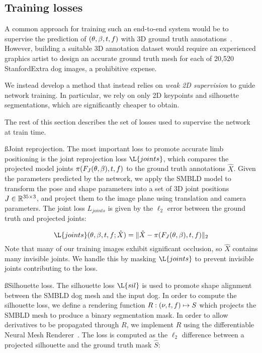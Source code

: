   \subsection{Training losses}
  
  A common approach for training such an end-to-end system would be to supervise the prediction of $(\theta, \beta, t, f)$ with 3D ground truth annotations~\cite{kolotouros2019learning,kanazawa18end-to-end,pavlakos18learning}. However, building a suitable 3D annotation dataset would require an experienced graphics artist to design an accurate ground truth mesh for each of 20,520 StanfordExtra dog images, a prohibitive expense.
  
  
  We instead develop a method that instead relies on \emph{weak 2D supervision} to guide network training. In particular, we rely on only 2D keypoints and silhouette segmentations, which are significantly cheaper to obtain.
  
  The rest of this section describes the set of losses used to supervise the network at train time.
  
  \ss{Joint reprojection.}
  The most important loss to promote accurate limb positioning is the joint reprojection loss $\L{joints}$, which compares the projected model joints $\pi(F_{J}(\theta, \beta), t, f)$ to the ground truth annotations $\hat{X}$. Given the parameters predicted by the network, we apply the SMBLD model to transform the pose and shape parameters into a set of 3D joint positions $J \in {\mathbb{R}^{35 \times 3}}$, and project them to the image plane using translation and camera parameters. The joint loss $L_{joints}$ is given by the $\ell_2$ error between the ground truth and projected joints:
  
  \begin{equation}
  \L{joints}(\pose, \shape, \trans, \f; \hat{X}) = \lVert \hat{X} - \pi(F_{J}(\pose, \shape), \trans, \f) \rVert_{2}
  \end{equation}
  Note that many of our training images exhibit significant occlusion, so $\hat{X}$ contains many invisible joints. We handle this by masking $\L{joints}$ to prevent invisible joints contributing to the loss.
  
  \ss{Silhouette loss.}
  The silhouette loss $\L{sil}$ is used to promote shape alignment between the SMBLD dog mesh and the input dog. In order to compute the silhouette loss, we define a rendering function $R: (\nu, t, f) \mapsto S$ which projects the SMBLD mesh to produce a binary segmentation mask. In order to allow derivatives to be propagated through $R$, we implement $R$ using the differentiable Neural Mesh Renderer~\cite{kato2018renderer}. The loss is computed as the $\ell_2$ difference between a projected silhouette and the ground truth mask $\hat{S}$:
  
